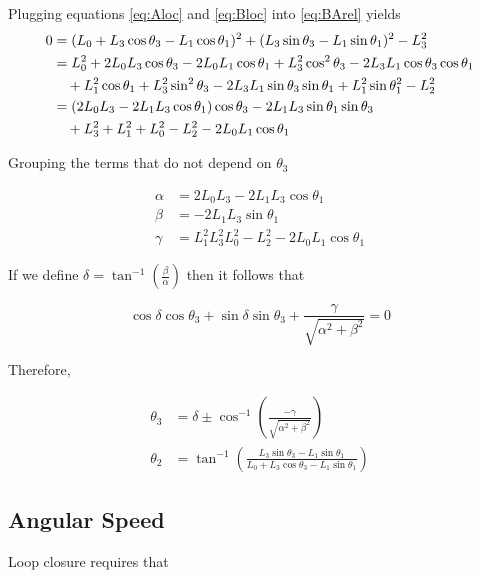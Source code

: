 \documentclass[letterpaper]{article}
\begin{document}
\noindent Plugging equations \ref{eq:Aloc} and \ref{eq:Bloc} into \ref{eq:BArel} yields
\begin{align}
	0 &= (L_0 + L_3 \cos \theta_3 - L_1 \cos \theta_1)^2 + (L_3 \sin \theta_3 - L_1 \sin \theta_1)^2 - L_3^2 \notag \\
	  &= L_0^2 + 2 L_0 L_3 \cos \theta_3 - 2 L_0 L_1 \cos \theta_1 + L_3^2 \cos^2 \theta_3 - 2 L_3 L_1 \cos \theta_3 \cos \theta_1 \notag \\
	  & \quad + L_1^2 \cos \theta_1 + L_3^2 \sin^2 \theta_3 - 2 L_3 L_1 \sin \theta_3 \sin \theta_1 + L_1^2 \sin \theta_1^2 - L_2^2 \notag \\
	  &= (2 L_0 L_3 - 2 L_1 L_3 \cos \theta_1) \cos \theta_3 - 2 L_1 L_3 \sin \theta_1 \sin \theta_3 \notag\\
	  & \quad + L_3^2 + L_1^2 + L_0^2 - L_2^2 - 2L_0 L_1 \cos \theta_1
\end{align}

\noindent Grouping the terms that do not depend on $\theta_3$ 

\begin{align*}
	\alpha &= 2 L_0 L_3 - 2 L_1 L_3 \cos \theta_1 \\
	\beta &= -2 L_1 L_3 \sin \theta_1 \\
	\gamma &= L_1^2 L_3^2 L_0^2 - L_2^2 - 2 L_0 L_1 \cos \theta_1 
\end{align*}

\noindent If we define $\delta = \tan^{-1} \left( \frac{\beta}{\alpha} \right)$ then it follows that

\begin{equation*}
	\cos \delta \cos \theta_3 + \sin \delta \sin \theta_3 + \frac{\gamma}{\sqrt{\alpha^2 + \beta^2}} = 0
\end{equation*}

\noindent Therefore, 

\begin{align*}
	\theta_3 &= \delta \pm \cos^{-1} \left( \frac{- \gamma}{\sqrt{\alpha^2 + \beta^2}} \right) \\
	\theta_2 &= \tan^{-1} \left( \frac{ L_3 \sin \theta_3 - L_1 \sin \theta_1}{L_0 + L_3 \cos \theta_3 - L_1 \sin \theta_1} \right)
\end{align*}

\subsection{Angular Speed}

Loop closure requires that
\end{document}
